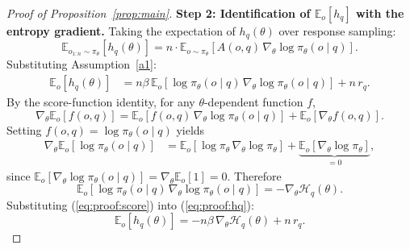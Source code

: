 \documentclass[10pt]{article}
\begin{document}
\begin{proof}[Proof of Proposition~\ref{prop:main}]
\medskip
\noindent\textbf{Step 2: Identification of $\mathbb{E}_o[h_q]$ with the entropy gradient.}
Taking the expectation of $h_q(\theta)$ over response sampling:
\begin{equation}
\mathbb{E}_{o_{1:n}\sim\pi_\theta}[h_q(\theta)] = n \cdot \mathbb{E}_{o\sim\pi_\theta}[A(o,q)\, \nabla_\theta \log\pi_\theta(o\mid q)].
\end{equation}
Substituting Assumption~\ref{a1}:
\begin{align}
\mathbb{E}_o[h_q(\theta)]
&= n\beta\, \mathbb{E}_o[\log\pi_\theta(o\mid q)\, \nabla_\theta \log\pi_\theta(o\mid q)] + n\, r_q.
\label{eq:proof:hq}
\end{align}
By the score-function identity, for any $\theta$-dependent function $f$,
\begin{equation}
\nabla_\theta \mathbb{E}_o[f(o,q)] = \mathbb{E}_o[f(o,q)\, \nabla_\theta \log\pi_\theta(o\mid q)] + \mathbb{E}_o[\nabla_\theta f(o,q)].
\end{equation}
Setting $f(o,q) = \log\pi_\theta(o\mid q)$ yields
\begin{align}
\nabla_\theta \mathbb{E}_o[\log\pi_\theta(o\mid q)]
&= \mathbb{E}_o[\log\pi_\theta\, \nabla_\theta \log\pi_\theta] + \underbrace{\mathbb{E}_o[\nabla_\theta \log\pi_\theta]}_{=0},
\end{align}
since $\mathbb{E}_o[\nabla_\theta \log\pi_\theta(o\mid q)] = \nabla_\theta \mathbb{E}_o[1] = 0$.
Therefore
\begin{equation}
\mathbb{E}_o[\log\pi_\theta(o\mid q)\, \nabla_\theta \log\pi_\theta(o\mid q)] = -\nabla_\theta \mathcal{H}_q(\theta).
\label{eq:proof:score}
\end{equation}
Substituting (\ref{eq:proof:score}) into (\ref{eq:proof:hq}):
\begin{equation}
\mathbb{E}_o[h_q(\theta)] = -n\beta\, \nabla_\theta \mathcal{H}_q(\theta) + n\, r_q.
\label{eq:proof:hq-final}
\end{equation}


\end{proof}
\end{document}

